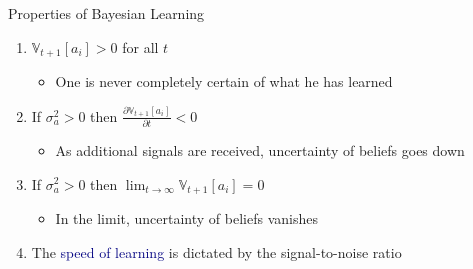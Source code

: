 \documentclass[aspectratio=169]{beamer}
\begin{document}
\begin{frame}

Properties of Bayesian Learning

\bigskip{}

\begin{enumerate}
\itemsep1.5em
\item<1-> $\mathbb{V}_{t+1}[a_i]>0$ for all $t$
\bigskip\par
    \begin{itemize}
    \itemsep1.5em
    \item<2-> One is never completely certain of what he has learned
    \end{itemize}
\item<3-> If $\sigma^2_a>0$ then $\frac{\partial\mathbb{V}_{t+1}[a_i]}{\partial t}<0$
\bigskip\par
    \begin{itemize}
    \itemsep1.5em
    \item<4-> As additional signals are received, uncertainty of beliefs goes down
    \end{itemize}
\item<5-> If $\sigma^2_a>0$ then $\lim_{t\rightarrow\infty}\mathbb{V}_{t+1}[a_i] = 0$
\bigskip\par
    \begin{itemize}
    \itemsep1.5em
    \item<6-> In the limit, uncertainty of beliefs vanishes
    \end{itemize}
\item<7-> The \textcolor{navy}{speed of learning} is dictated by the signal-to-noise ratio
\end{enumerate}


\end{frame}
\end{document}
